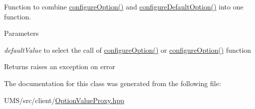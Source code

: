 Function to combine \hyperlink{classOptionValueProxy_ae6db8f1eb397361e86a37c45afca234f}{configureOption()} and \hyperlink{classOptionValueProxy_a2d4ef21b234a046918844158a5c9197f}{configureDefaultOption()} into one function. 


\begin{DoxyParams}{Parameters}
\item[{\em defaultValue}]to select the call of \hyperlink{classOptionValueProxy_ae6db8f1eb397361e86a37c45afca234f}{configureOption()} or \hyperlink{classOptionValueProxy_ae6db8f1eb397361e86a37c45afca234f}{configureOption()} function \end{DoxyParams}
\begin{DoxyReturn}{Returns}
raises an exception on error 
\end{DoxyReturn}


The documentation for this class was generated from the following file:\begin{DoxyCompactItemize}
\item 
UMS/src/client/\hyperlink{OptionValueProxy_8hpp}{OptionValueProxy.hpp}\end{DoxyCompactItemize}

